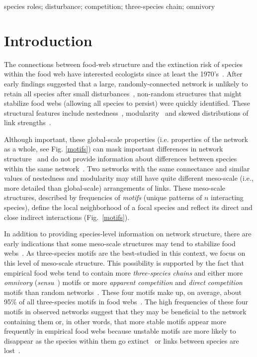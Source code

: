 \documentclass[12pt]{article}
\begin{document}
\begin{spacing}{2.0}
	species roles; disturbance; competition; three-species chain; omnivory

\clearpage
    
\section*{Introduction}

	The connections between food-web structure and the extinction risk of species within the food web have interested ecologists since at least the 1970's~\citep{May1972}. After early findings suggested that a large, randomly-connected network is unlikely to retain all species after small disturbances~\citep{Gardner1970,May1972}, non-random structures that might stabilize food webs (allowing all species to persist) were quickly identified. These structural features include nestedness~\citep{Allesina2012,Sauve2014}, modularity~\citep{Sauve2014,Thebault2010} and skewed distributions of link strengths~\citep{McCann1998,Gross2009,Rooney2012,Wootton2016}.
	
	
	Although important, these global-scale properties (i.e. properties of the network as a whole, see Fig. \ref{motifs}) can mask important differences in  network structure~\citep{Simmons2019} and do not provide information about differences between species within the same network~\citep{Cirtwill2018FoodWebs}. 
	Two networks with the same connectance and similar values of nestedness and modularity may still have quite different meso-scale (i.e., more detailed than global-scale) arrangements of links. 
	These meso-scale structures, described by frequencies of \emph{motifs} (unique patterns of $n$ interacting species), define the local neighborhood of a focal species and reflect its direct and close indirect interactions (Fig.~\ref{motifs}).
	

    In addition to providing species-level information on network structure, there are early indications that some meso-scale structures may tend to stabilize food webs~\citep{Prill2005,Borrelli2015,Monteiro2016}. 
    As three-species motifs are the best-studied in this context, we focus on this level of meso-scale structure.
    This possibility is supported by the fact that empirical food webs tend to contain more \emph{three-species chains} and either more \emph{omnivory} (\emph{sensu}~\citealp[]{Thompson2007b}) motifs or more \emph{apparent competition} and \emph{direct competition} motifs than random networks~\citep{Stouffer2007}. 
    These four motifs make up, on average, about 95\% of all three-species motifs in food webs~\citep{Stouffer2010b}. 
    The high frequencies of these four motifs in observed networks suggest that they may be beneficial to the network containing them or, in other words, that more stable motifs appear more frequently in empirical food webs because unstable motifs are more likely to disappear as the species within them go extinct~\citep{Borrelli2015,Borrelli2015a} or links between species are lost~\citep{Tylianakis2010}.


\end{spacing}
\end{document}
